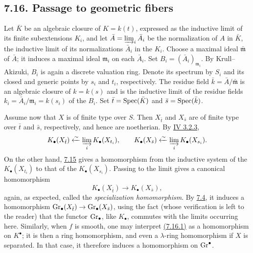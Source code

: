 
\subsection*{7.16. Passage to geometric fibers}
Let $\bar K$ be an algebraic closure of $K=k(t)$, expressed as the inductive
limit of its finite subextensions $K_i$, and let
$\bar A=\varinjlim_i\bar A_i$ be the normalization of $A$ in $\bar K$, the
inductive limit of its normalizations $\bar A_i$ in the $K_i$. Choose a
maximal ideal $\bar{\mathfrak m}$ of $\bar A$; it induces a maximal ideal
$\mathfrak m_i$ on each $\bar A_i$. Set
$B_i=(\bar A_i)_{\mathfrak m_i}$. By Krull--Akizuki, $B_i$ is again a
discrete valuation ring. Denote its spectrum by $S_i$ and its closed and
generic points by $s_i$ and $t_i$, respectively. The residue field
$\bar k=\bar A/\bar{\mathfrak m}$ is an algebraic closure of $k=k(s)$ and is
the inductive limit of the residue fields
$k_i=\bar A_i/\mathfrak m_i=k(s_i)$ of the $B_i$. Set
$\bar t=\operatorname{Spec}(\bar K)$ and $\bar s=\operatorname{Spec}(\bar k)$.

Assume now that $X$ is of finite type over $S$. Then $X_{\bar t}$ and
$X_{\bar s}$ are of finite type over $\bar t$ and $\bar s$, respectively,
and hence are noetherian. By \hyperlink{sga6.e04.para.3-2-3}{IV 3.2.3},
\[
K_\bullet(X_{\bar t})\xleftarrow{\sim}
  \varinjlim_i K_\bullet(X_{t_i}),
\qquad
K_\bullet(X_{\bar s})\xleftarrow{\sim}
  \varinjlim_i K_\bullet(X_{s_i}).
\]
On the other hand, \hyperlink{sga6.e10.sec.7.15}{7.15} gives a homomorphism from the inductive system of the
$K_\bullet(X_{t_i})$ to that of the $K_\bullet(X_{s_i})$. Passing to the
limit gives a canonical homomorphism
\begin{equation}\tag{7.16.1}
K_\bullet(X_{\bar t})\longrightarrow K_\bullet(X_{\bar s}),
\end{equation}
again, as expected, called the \emph{specialization homomorphism}. By
\hyperlink{sga6.e10.sec.7.4}{7.4}, it induces a homomorphism
$\operatorname{Gr}_\bullet(X_{\bar t})\to\operatorname{Gr}_\bullet(X_{\bar s})$, using the fact (whose
verification is left to the reader) that the functor $\operatorname{Gr}_\bullet$, like
$K_\bullet$, commutes with the limits occurring here. Similarly, when $f$
is smooth, one may interpret \hyperlink{sga6.e10.eq.7-16-1}{(7.16.1)} as a homomorphism on $K^\bullet$; it is
then a ring homomorphism, and even a $\lambda$-ring homomorphism if $X$ is
separated. In that case, it therefore induces a homomorphism on
$\operatorname{Gr}^\bullet$.

